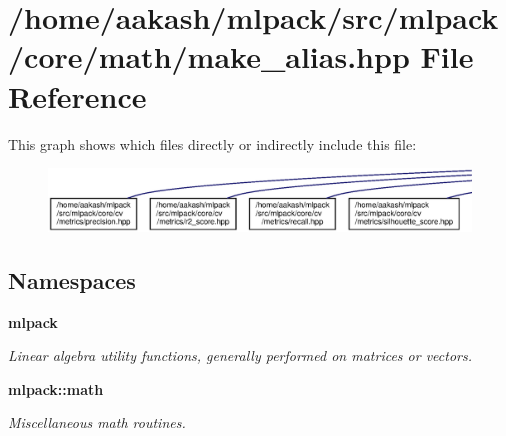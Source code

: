 \section{/home/aakash/mlpack/src/mlpack/core/math/make\+\_\+alias.hpp File Reference}
\label{make__alias_8hpp}
This graph shows which files directly or indirectly include this file\+:
\nopagebreak
\begin{figure}[H]
\begin{center}
\leavevmode
\includegraphics[width=350pt]{make__alias_8hpp__dep__incl}
\end{center}
\end{figure}
\subsection*{Namespaces}
\begin{DoxyCompactItemize}
\item 
 \textbf{ mlpack}
\begin{DoxyCompactList}\small\item\em Linear algebra utility functions, generally performed on matrices or vectors. \end{DoxyCompactList}\item 
 \textbf{ mlpack\+::math}
\begin{DoxyCompactList}\small\item\em Miscellaneous math routines. \end{DoxyCompactList}\end{DoxyCompactItemize}
